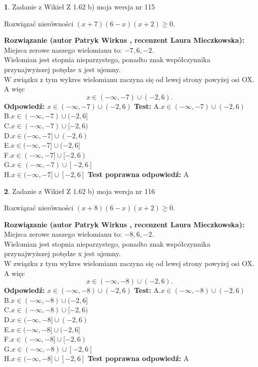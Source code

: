 \documentclass[12pt, a4paper]{article}
\theoremstyle{definition} %
\newtheorem{zad}{}
\newcommand{\zadStart}[1]{\begin{zad}#1\newline}
\newcommand{\zadStop}{\end{zad}}
\newcommand{\rozwStart}[2]{\noindent \textbf{Rozwiązanie (autor #1 , recenzent #2): }\newline}
\newcommand{\rozwStop}{\newline}
\newcommand{\odpStart}{\noindent \textbf{Odpowiedź:}\newline}
\newcommand{\odpStop}{\newline}
\newcommand{\testStart}{\noindent \textbf{Test:}\newline}
\newcommand{\testStop}{\newline}
\newcommand{\kluczStart}{\noindent \textbf{Test poprawna odpowiedź:}\newline}
\newcommand{\kluczStop}{\newline}
\begin{document}
\zadStart{Zadanie z Wikieł Z 1.62 b) moja wersja nr 115}

Rozwiązać nierówności $(x+7)(6-x)(x+2)\ge0$.
\zadStop
\rozwStart{Patryk Wirkus}{Laura Mieczkowska}
Miejsca zerowe naszego wielomianu to: $-7, 6, -2$.\\
Wielomian jest stopnia nieparzystego, ponadto znak współczynnika przy\linebreak najwyższej potędze x jest ujemny.\\ W związku z tym wykres wielomianu zaczyna się od lewej strony powyżej osi OX. A więc $$x \in (-\infty,-7) \cup (-2,6).$$
\rozwStop
\odpStart
$x \in (-\infty,-7) \cup (-2,6)$
\odpStop
\testStart
A.$x \in (-\infty,-7) \cup (-2,6)$\\
B.$x \in (-\infty,-7) \cup (-2,6]$\\
C.$x \in (-\infty,-7) \cup [-2,6)$\\
D.$x \in (-\infty,-7] \cup (-2,6)$\\
E.$x \in (-\infty,-7] \cup (-2,6]$\\
F.$x \in (-\infty,-7] \cup [-2,6)$\\
G.$x \in (-\infty,-7) \cup [-2,6]$\\
H.$x \in (-\infty,-7] \cup [-2,6]$
\testStop
\kluczStart
A
\kluczStop



\zadStart{Zadanie z Wikieł Z 1.62 b) moja wersja nr 116}

Rozwiązać nierówności $(x+8)(6-x)(x+2)\ge0$.
\zadStop
\rozwStart{Patryk Wirkus}{Laura Mieczkowska}
Miejsca zerowe naszego wielomianu to: $-8, 6, -2$.\\
Wielomian jest stopnia nieparzystego, ponadto znak współczynnika przy\linebreak najwyższej potędze x jest ujemny.\\ W związku z tym wykres wielomianu zaczyna się od lewej strony powyżej osi OX. A więc $$x \in (-\infty,-8) \cup (-2,6).$$
\rozwStop
\odpStart
$x \in (-\infty,-8) \cup (-2,6)$
\odpStop
\testStart
A.$x \in (-\infty,-8) \cup (-2,6)$\\
B.$x \in (-\infty,-8) \cup (-2,6]$\\
C.$x \in (-\infty,-8) \cup [-2,6)$\\
D.$x \in (-\infty,-8] \cup (-2,6)$\\
E.$x \in (-\infty,-8] \cup (-2,6]$\\
F.$x \in (-\infty,-8] \cup [-2,6)$\\
G.$x \in (-\infty,-8) \cup [-2,6]$\\
H.$x \in (-\infty,-8] \cup [-2,6]$
\testStop
\kluczStart
A
\kluczStop
\end{document}
